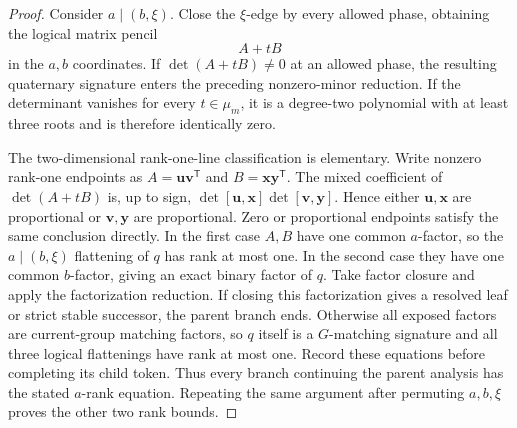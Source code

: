 \documentclass[11pt,letterpaper,onecolumn]{article}
\theoremstyle{plain}
\theoremstyle{definition}
\theoremstyle{remark}
\begin{document}
\begin{proof}
Consider \(a\mid(b,\xi)\).  Close the \(\xi\)-edge by every allowed phase,
obtaining the logical matrix pencil
\[
 A+tB
\]
in the \(a,b\) coordinates.  If \(\det(A+tB)\ne0\) at an allowed phase, the resulting quaternary signature enters the preceding nonzero-minor reduction.  If the
determinant vanishes for every \(t\in\mu_m\), it is a degree-two polynomial
with at least three roots and is therefore identically zero.

The two-dimensional rank-one-line classification is elementary.  Write
nonzero rank-one endpoints as \(A={\mathbf{u}}{\mathbf{v}}^{\mathsf T}\) and
\(B={\mathbf{x}}{\mathbf{y}}^{\mathsf T}\).  The mixed coefficient of
\(\det(A+tB)\) is, up to sign,
\(\det[{\mathbf{u}},{\mathbf{x}}]\det[{\mathbf{v}},{\mathbf{y}}]\).  Hence either \({\mathbf{u}},{\mathbf{x}}\) are proportional or
\({\mathbf{v}},{\mathbf{y}}\) are proportional. Zero or proportional endpoints satisfy the same
conclusion directly.  In the first case \(A,B\) have one common
\(a\)-factor, so the \(a\mid(b,\xi)\) flattening of \(q\) has rank at most
one.  In the second case they have one common \(b\)-factor, giving an exact
binary factor of \(q\). Take factor closure and apply the factorization reduction.
If closing this factorization gives a resolved leaf or strict stable
successor, the parent branch ends.  Otherwise all exposed factors are
current-group matching factors, so \(q\) itself is a \(G\)-matching signature and all three logical flattenings have rank at most one. Record
these equations before completing its child token.  Thus every branch
continuing the parent analysis has the stated \(a\)-rank equation.
Repeating the same argument after permuting \(a,b,\xi\) proves the other two
rank bounds.
\end{proof}
\end{document}
